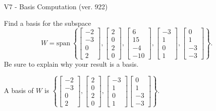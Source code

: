 \begin{exercise}
  \begin{exerciseTitle}V7 - Basis Computation (ver. 922)\end{exerciseTitle}
  \begin{exerciseStatement}
    Find a basis for the subspace 
\[W=\mathrm{span}\ \left\{\left[\begin{array}{r}
-2 \\
-3 \\
0 \\
2
\end{array}\right] , \left[\begin{array}{r}
2 \\
0 \\
2 \\
0
\end{array}\right] , \left[\begin{array}{r}
6 \\
15 \\
-4 \\
-10
\end{array}\right] , \left[\begin{array}{r}
-3 \\
1 \\
0 \\
1
\end{array}\right] , \left[\begin{array}{r}
0 \\
1 \\
-3 \\
-3
\end{array}\right]\right\}.\]
 Be sure to explain why your result is a basis.


  \end{exerciseStatement}
  \begin{exerciseAnswer}
   A basis of \(W\) is  \(\left\{\left[\begin{array}{r}
-2 \\
-3 \\
0 \\
2
\end{array}\right] , \left[\begin{array}{r}
2 \\
0 \\
2 \\
0
\end{array}\right] , \left[\begin{array}{r}
-3 \\
1 \\
0 \\
1
\end{array}\right] \left[\begin{array}{r}
0 \\
1 \\
-3 \\
-3
\end{array}\right]\right\}\).
  


  \end{exerciseAnswer}
\end{exercise}